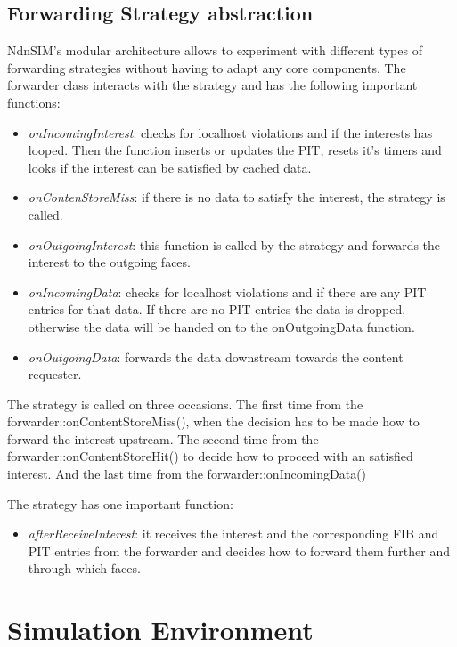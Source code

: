 \subsection{Forwarding Strategy abstraction}

NdnSIM's modular architecture allows to experiment with different types of forwarding strategies without having to adapt any core components. The forwarder class interacts with the strategy and has the following important functions:

\begin{itemize}
\item \emph{onIncomingInterest}: checks for localhost violations and if the interests has looped. Then the function inserts or updates the PIT, resets it's timers and looks if the interest can be satisfied by cached data.
\item \emph{onContenStoreMiss}: if there is no data to satisfy the interest, the strategy is called.
\item \emph{onOutgoingInterest}: this function is called by the strategy and forwards the interest to the outgoing faces.
\item \emph{onIncomingData}: checks for localhost violations and if there are any PIT entries for that data. If there are no PIT entries the data is dropped, otherwise the data will be handed on to the onOutgoingData function.
\item \emph{onOutgoingData}: forwards the data downstream towards the content requester.
\end{itemize}


The strategy is called on three occasions. The first time from the forwarder::onContentStoreMiss(), when the decision has to be made how to forward the interest upstream. The second time from the forwarder::onContentStoreHit() to decide how to proceed with an satisfied interest. And the last time from the forwarder::onIncomingData()

\vspace{5mm} %

The strategy has one important function:

\begin{itemize}
\item \emph{afterReceiveInterest}: it receives the interest and the corresponding FIB and PIT entries from the forwarder and decides how to forward them further and through which faces.
\end{itemize}

\section{Simulation Environment}

